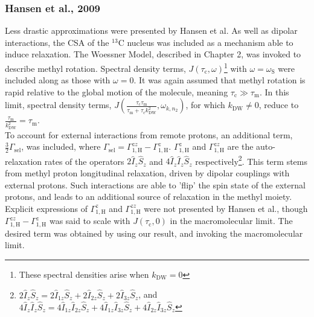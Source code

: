 \subsubsection{Hansen et al., 2009}
Less drastic approximations were presented by Hansen et al.\cite{RN4} As well as dipolar interactions, the CSA of the $^{13}$C nucleus was included as a mechanism able to induce relaxation. The Woessner Model, described in Chapter 2, was invoked to describe methyl rotation. Spectral density terms, $J\left(\tau_{\text{c}}, \omega\right)$\footnote{These spectral densities arise when $k_{\text{DW}} = 0$} with $\omega = \omega_{\text{S}}$ were included along as those with $\omega = 0$. It was again assumed that methyl rotation is rapid relative to the global motion of the molecule, meaning  $\tau_{\text{c}} \gg \tau_{\text{m}}$. In this limit, spectral density terms, $J\left(\frac{\tau_{\text{c}} \tau_{\text{m}}}{\tau_{\text{m}} + \tau_{\text{c}} k_{\text{DW}}^2}, \omega_{k,n_2}\right)$, for which $k_{\text{DW}} \neq 0$, reduce to $\frac{\tau_{\text{m}}}{k_{\text{DW}}^2} = \tau_{\text{m}}$.\\
To account for external interactions from remote protons, an additional term, $\frac{3}{2} \Gamma_{\text{sel}}$, was included, where $\Gamma_{\text{sel}} = \Gamma_{1,\text{H}}^{zz} - \Gamma_{1,\text{H}}^{z}$. $\Gamma_{1,\text{H}}^{z}$ and $\Gamma_{1,\text{H}}^{zz}$ are the auto-relaxation rates of the operators $2\hat{I}_z\hat{S}_z$ and $4\hat{I}_z\hat{I}_z\hat{S}_z$ respectively\footnote{$2\hat{I}_z\hat{S}_z = 2\hat{I}_{1z}\hat{S}_z + 2\hat{I}_{2z}\hat{S}_z + 2\hat{I}_{3z}\hat{S}_z$, and $4\hat{I}_z\hat{I}_z\hat{S}_z = 4\hat{I}_{1z}\hat{I}_{2z}\hat{S}_z+ 4\hat{I}_{1z}\hat{I}_{3z}\hat{S}_z + 4\hat{I}_{2z}\hat{I}_{3z}\hat{S}_z$}. This term stems from methyl proton longitudinal relaxation, driven by dipolar couplings with external protons. Such interactions are able to 'flip' the spin state of the external protons, and leads to an additional source of relaxation in the methyl moiety. Explicit expressions of $\Gamma_{1,\text{H}}^{z}$ and $\Gamma_{1,\text{H}}^{zz}$ were not presented by Hansen et al., though $\Gamma_{1,\text{H}}^{zz} - \Gamma_{1,\text{H}}^{z}$ was said to scale with $J(\tau_{\text{c}},0)$ in the macromolecular limit.  The desired term was obtained by using our result, and invoking the macromolecular limit.
